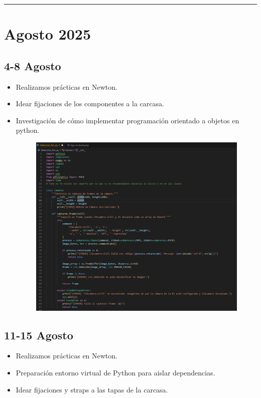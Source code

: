 \documentclass[12pt,a4paper]{article}
\newcommand{\separador}{\vspace{0.5cm}\noindent\rule{\linewidth}{0.5pt}\vspace{0.5cm}}
\begin{document}
\separador

\section*{Agosto 2025}

\subsection*{4-8 Agosto}

\begin{itemize}
\item Realizamos prácticas en Newton.
\item Idear fijaciones de los componentes a la carcasa.
\item Investigación de cómo implementar programación orientado a objetos en python.
\begin{figure}[H]
\includegraphics[width=\linewidth]{Carpeta de campo/Imagen22.png}
\end{figure}

\end{itemize}

\subsection*{11-15 Agosto}
\begin{itemize}
\item Realizamos prácticas en Newton.
\item Preparación entorno virtual de Python para aislar dependencias.
\item Idear fijaciones y straps a las tapas de la carcasa.
\end{itemize}
\end{document}
